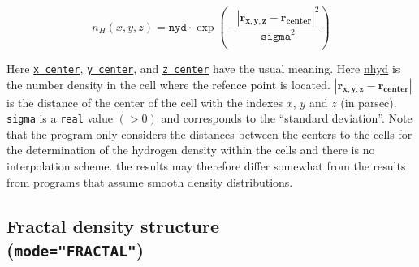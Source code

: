 \documentclass[a4paper,10pt]{article}
\begin{document}
\begin{equation}
 n_H(x,y,z) = \mathtt{nyd} \cdot \exp\left(- \frac{\left|\mathbf{r_{x,y,z}} - 
\mathbf{r_{center}} \right|^2}{\mathtt{sigma}^2}\right)
\end{equation}

Here \hyperref[hydopt:xcenter]{\texttt{x\_center}}, 
\hyperref[hydopt:ycenter]{\texttt{y\_center}}, 
and \hyperref[hydopt:zcenter]{\texttt{z\_center}} have the 
usual meaning. 
Here \hyperref[hydopt:nhyd]{nhyd} is the number density in the cell where the 
refence point is located. 
$\left|\mathbf{r_{x,y,z}} - \mathbf{r_{center}} \right|$ is the
distance of the center of the cell with the indexes $x$, $y$ and $z$ (in 
parsec). 
\texttt{sigma} is a \texttt{real} value $(>0)$ and corresponds to the ``standard
deviation''.
Note that the program only considers the distances between the centers to the 
cells for the determination of the hydrogen density within the cells and there 
is no interpolation scheme. the results may therefore differ somewhat from the 
results from programs that assume smooth density distributions.

\subsection{Fractal density structure\\
(\texttt{mode="FRACTAL"})}
\end{document}
